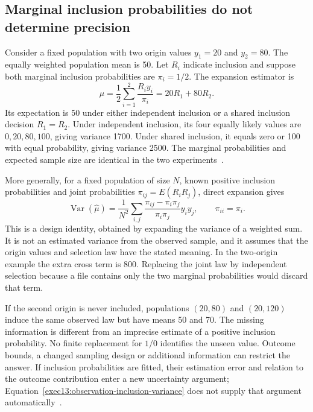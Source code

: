 \subsection{Marginal inclusion probabilities do not determine precision}

Consider a fixed population with two origin values $y_1=20$ and $y_2=80$.
The equally weighted population mean is 50. Let $R_i$ indicate inclusion
and suppose both marginal inclusion probabilities are $\pi_i=1/2$. The
expansion estimator is
\[
 \widehat\mu=\frac12\sum_{i=1}^2\frac{R_i y_i}{\pi_i}
             =20R_1+80R_2.
\]
Its expectation is 50 under either independent inclusion or a shared
inclusion decision $R_1=R_2$. Under independent inclusion, its four equally
likely values are $0,20,80,100$, giving variance 1700. Under shared inclusion,
it equals zero or 100 with equal probability, giving variance 2500.
The marginal probabilities and expected sample size are identical in the
two experiments~\citep{exec13_observation_exact}.

More generally, for a fixed population of size $N$, known positive
inclusion probabilities and joint probabilities
$\pi_{ij}=E(R_iR_j)$, direct expansion gives
\begin{equation}
 \operatorname{Var}(\widehat\mu)
 =\frac{1}{N^2}\sum_{i,j}
   \frac{\pi_{ij}-\pi_i\pi_j}{\pi_i\pi_j}y_i y_j,
 \qquad \pi_{ii}=\pi_i.
 \label{exec13:observation-inclusion-variance}
\end{equation}
This is a design identity, obtained by expanding the variance of a weighted
sum. It is not an estimated variance from the observed sample, and it assumes
that the origin values and selection law have the stated meaning. In the
two-origin example the extra cross term is 800. Replacing the joint law
by independent selection because a file contains only the two marginal
probabilities would discard that term.

If the second origin is never included, populations $(20,80)$ and
$(20,120)$ induce the same observed law but have means 50 and 70. The
missing information is different from an imprecise estimate of a positive
inclusion probability. No finite replacement for $1/0$ identifies the unseen
value. Outcome bounds, a changed sampling design or additional information
can restrict the answer. If inclusion probabilities are fitted, their
estimation error and relation to the outcome contribution enter a new
uncertainty argument; Equation~\eqref{exec13:observation-inclusion-variance}
does not supply that argument automatically~\citep{exec13_observation_exact}.

